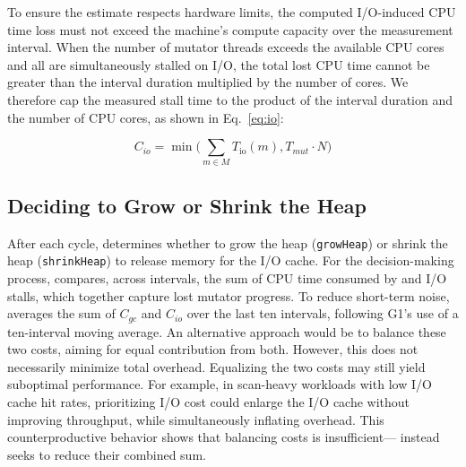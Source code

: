 To ensure the estimate respects hardware limits, the computed I/O-induced CPU time loss must not exceed the machine’s compute capacity over the measurement interval.
When the number of mutator threads exceeds the available CPU cores and all are simultaneously stalled on I/O, the total lost CPU time cannot be greater than the interval duration multiplied by the number of cores.
We therefore cap the measured stall time to the product of the interval duration and the number of CPU cores, as shown in Eq.~\ref{eq:io}:

\begin{equation}
	\label{eq:io}
	\mathit{C}_\mathit{io} = \min \bigl(\displaystyle \sum_{m \in M} T_{\mathrm{io}}(m), T_\mathit{mut} \cdot N \bigr)
\end{equation}

\subsection{Deciding to Grow or Shrink the Heap}
\label{sec:policy}


After each \flexheapGC{} cycle, \flexheapName{} determines whether to grow the heap (\texttt{growHeap}) or shrink the heap (\texttt{shrinkHeap}) to release memory for the I/O cache.
For the decision-making process, \flexheapName{} compares, across intervals, the sum of CPU time consumed by \flexheapGC{} and I/O stalls, which together capture lost mutator progress.
To reduce short-term noise, \flexheapName{} averages the sum of $C_\mathit{gc}$ and $C_\mathit{io}$ over the last ten intervals, following G1's use of a ten-interval moving average.
An alternative approach would be to balance these two costs, aiming for equal contribution from both.
However, this does not necessarily minimize total overhead.
Equalizing the two costs may still yield suboptimal performance.
For example, in scan-heavy workloads with low I/O cache hit rates, prioritizing I/O cost could enlarge the I/O cache without improving throughput, while simultaneously inflating \flexheapGC{} overhead.
This counterproductive behavior shows that balancing costs is insufficient—\flexheapName{} instead seeks to reduce their combined sum.

